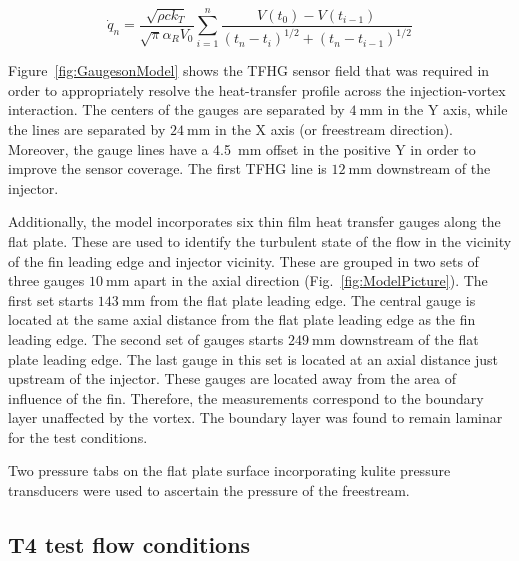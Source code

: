 \documentclass{AIAA}
\begin{document}
\begin{equation}
\dot{q}_n = \frac{\sqrt{\rho c k_T}}{\sqrt{\pi}\alpha_R V_0}\sum^n_{i=1}\frac{V\left(t_0\right)-V\left(t_{i-1}\right)}{\left(t_n-t_i\right)^{1/2}+\left(t_n-t_{i-1}\right)^{1/2}}
\label{eq:TFHG_Heat} 
\end{equation}


Figure~\ref{fig:GaugesonModel} shows the TFHG sensor field that was required in order to appropriately resolve the heat-transfer profile across the injection-vortex interaction.
The centers of the gauges are separated by $\SI{4}{\milli\meter}$ in the Y axis, while the lines are separated by $\SI{24}{\milli\meter}$ in the X axis (or freestream direction).
Moreover, the gauge lines have a \SI{4.5}{\milli\meter} offset in the positive Y in order to improve the sensor coverage.
The first TFHG line is $\SI{12}{\milli\meter}$ downstream of the injector.


\hfill\newline

Additionally, the model incorporates six thin film heat transfer gauges along the flat plate.
These are used to identify the turbulent state of the flow in the vicinity of the fin leading edge and injector vicinity.
These are grouped in two sets of three gauges $\SI{10}{\milli\meter}$ apart in the axial direction (Fig.~\ref{fig:ModelPicture}).
The first set starts $\SI{143}{\milli\meter}$ from the flat plate leading edge.
The central gauge is located at the same axial distance from the flat plate leading edge as the fin leading edge.
The second set of gauges starts $\SI{249}{\milli\meter}$ downstream of the flat plate leading edge.
The last gauge in this set is located at an axial distance just upstream of the injector.
These gauges are located away from the area of influence of the fin. Therefore, the measurements correspond to the boundary layer unaffected by the vortex.
The boundary layer was found to remain laminar for the test conditions.

Two pressure tabs on the flat plate surface incorporating kulite pressure transducers were used to ascertain the pressure of the freestream.




\subsection{T4 test flow conditions}
\end{document}
